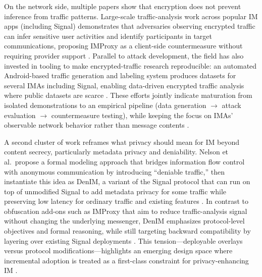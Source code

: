 On the network side, multiple papers show that encryption does not prevent inference from traffic patterns. Large-scale traffic-analysis work across popular IM apps (including Signal) demonstrates that adversaries observing encrypted traffic can infer sensitive user activities and identify participants in target communications, proposing IMProxy as a client-side countermeasure without requiring provider support \cite{bozorgi2023}. Parallel to attack development, the field has also invested in tooling to make encrypted-traffic research reproducible: an automated Android-based traffic generation and labeling system produces datasets for several IMAs including Signal, enabling data-driven encrypted traffic analysis where public datasets are scarce \cite{erdenebaatar2023}. These efforts jointly indicate maturation from isolated demonstrations to an empirical pipeline (data generation $\rightarrow$ attack evaluation $\rightarrow$ countermeasure testing), while keeping the focus on IMAs’ observable network behavior rather than message contents \cite{erdenebaatar2023,bozorgi2023}.

A second cluster of work reframes what privacy should mean for IM beyond content secrecy, particularly metadata privacy and deniability. Nelson et al.\ propose a formal modeling approach that bridges information flow control with anonymous communication by introducing “deniable traffic,” then instantiate this idea as DenIM, a variant of the Signal protocol that can run on top of unmodified Signal to add metadata privacy for some traffic while preserving low latency for ordinary traffic and existing features \cite{nelson2024}. In contrast to obfuscation add-ons such as IMProxy that aim to reduce traffic-analysis signal without changing the underlying messenger, DenIM emphasizes protocol-level objectives and formal reasoning, while still targeting backward compatibility by layering over existing Signal deployments \cite{nelson2024,bozorgi2023}. This tension—deployable overlays versus protocol modifications—highlights an emerging design space where incremental adoption is treated as a first-class constraint for privacy-enhancing IM \cite{nelson2024}.

